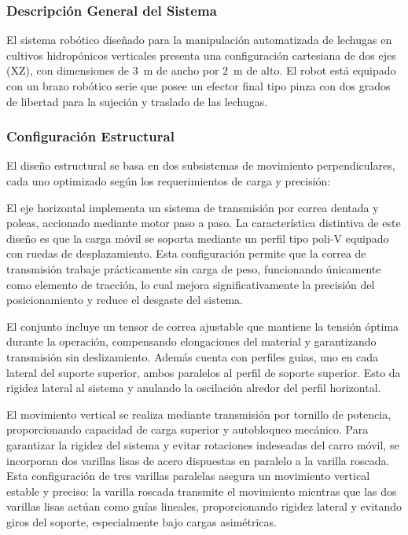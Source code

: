 
\subsubsection{Descripción General del Sistema}

El sistema robótico diseñado para la manipulación automatizada de lechugas en cultivos hidropónicos verticales presenta una configuración cartesiana de dos ejes (XZ), con dimensiones de 3~m de ancho por 2~m de alto. El robot está equipado con un brazo robótico serie que posee un efector final tipo pinza con dos grados de libertad para la sujeción y traslado de las lechugas.

\subsubsection{Configuración Estructural}

El diseño estructural se basa en dos subsistemas de movimiento perpendiculares, cada uno optimizado según los requerimientos de carga y precisión:

El eje horizontal implementa un sistema de transmisión por correa dentada y poleas, accionado mediante motor paso a paso. La característica distintiva de este diseño es que la carga móvil se soporta mediante un perfil tipo poli-V equipado con ruedas de desplazamiento. Esta configuración permite que la correa de transmisión trabaje prácticamente sin carga de peso, funcionando únicamente como elemento de tracción, lo cual mejora significativamente la precisión del posicionamiento y reduce el desgaste del sistema.

El conjunto incluye un tensor de correa ajustable que mantiene la tensión óptima durante la operación, compensando elongaciones del material y garantizando transmisión sin deslizamiento. Además cuenta con perfiles guias, uno en cada lateral del suporte superior, ambos paralelos al perfil de soporte superior. Esto da rigidez lateral al sistema y anulando la oscilación alredor del perfil horizontal.

El movimiento vertical se realiza mediante transmisión por tornillo de potencia, proporcionando capacidad de carga superior y autobloqueo mecánico. Para garantizar la rigidez del sistema y evitar rotaciones indeseadas del carro móvil, se incorporan dos varillas lisas de acero dispuestas en paralelo a la varilla roscada. Esta configuración de tres varillas paralelas asegura un movimiento vertical estable y preciso: la varilla roscada transmite el movimiento mientras que las dos varillas lisas actúan como guías lineales, proporcionando rigidez lateral y evitando giros del soporte, especialmente bajo cargas asimétricas.

